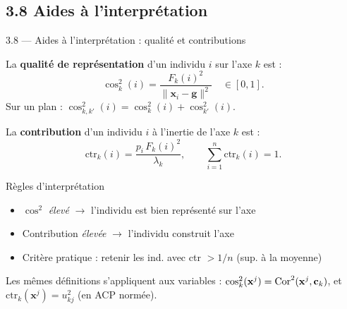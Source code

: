 \subsection{3.8 Aides à l'interprétation}
\begin{frame}{3.8 — Aides à l'interprétation : qualité et contributions}
\begin{definition}
La \textbf{qualité de représentation} d'un individu $i$ sur l'axe $k$ est :
\[
\cos^2_k(i) = \frac{F_k(i)^2}{\|\mathbf{x}_i - \mathbf{g}\|^2}
\quad\in [0, 1].
\]
Sur un plan : $\cos^2_{k,k'}(i) = \cos^2_k(i) + \cos^2_{k'}(i)$.
\end{definition}

\begin{definition}[Contribution]
La \textbf{contribution} d'un individu $i$ à l'inertie de l'axe $k$ est :
\[
\text{ctr}_k(i) = \frac{p_i \, F_k(i)^2}{\lambda_k}, \qquad
\sum_{i=1}^n \text{ctr}_k(i) = 1.
\]
\end{definition}

\begin{block}{Règles d'interprétation}
\begin{itemize}\small
  \item $\cos^2$ \emph{élevé} $\to$ l'individu est \alert{bien représenté} sur l'axe
  \item Contribution \emph{élevée} $\to$ l'individu \alert{construit} l'axe
  \item Critère pratique : retenir les ind. avec ctr $> 1/n$ (sup. à la moyenne)
\end{itemize}
\end{block}

\begin{rema}[Variables]
\small Les mêmes définitions s'appliquent aux variables :
$\cos^2_k(\mathbf{x}^j) = \operatorname{Cor}^2(\mathbf{x}^j, \mathbf{c}_k)$, et $\text{ctr}_k(\mathbf{x}^j) = u_{kj}^2$ (en ACP normée).
\end{rema}
\end{frame}

